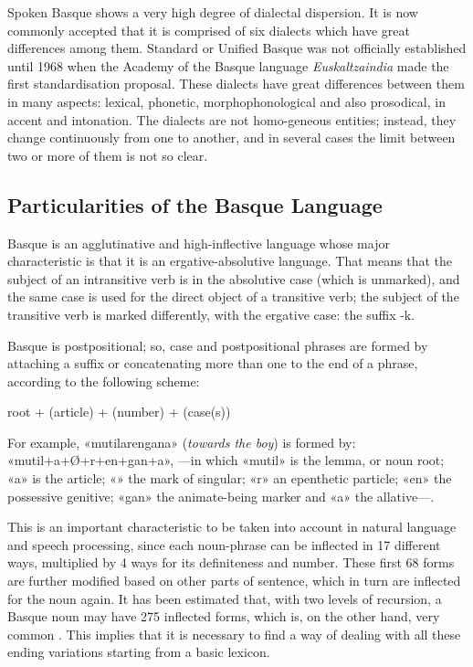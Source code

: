 \begin{multicols}{2}

Spoken Basque shows a very high degree of dialectal dispersion. It is now commonly accepted that it is comprised of six dialects which have great differences among them. Standard or Unified Basque was not officially established until 1968 when the Academy of the Basque language\textit{ Euskaltzaindia} \cite{BAS-Nota7}  made the first standardisation proposal. These dialects have great differences between them in many aspects: lexical, phonetic, morphophonological and also prosodical, in accent and intonation. The dialects are not homo-geneous entities; instead, they change continuously from one to another, and in several cases the limit between two or more of them is not so clear.

\subsection{Particularities of the Basque Language}
   Basque is an agglutinative and high-inflective language whose major characteristic is that it is an ergative-absolutive language. That means that the subject of an intransitive verb is in the absolutive case (which is unmarked), and the same case is used for the direct object of a transitive verb; the subject of the transitive verb is marked differently, with the ergative case: the suffix -k.


Basque is postpositional; so, case and postpositional phrases are formed by attaching a suffix or concatenating more than one to the end of a phrase, according to the following scheme:

\hspace{10pt}root + (article) + (number) + (case(s))

For example, «mutilarengana» (\textit{towards the boy}) is formed by: «mutil+a+Ø+r\-+en+gan+a», —in which «mutil» is the lemma, or noun root; «a» is the article; «» the mark of singular; «r» an epenthetic particle; «en» the possessive genitive; «gan» the animate-being marker and «a» the allative—.

This is an important characteristic to be taken into account in natural language and speech processing, since each noun-phrase can be inflected in 17 different ways, multiplied by 4 ways for its definiteness and number. These first 68 forms are further modified based on other parts of sentence, which in turn are inflected for the noun again. It has been estimated that, with two levels of recursion, a Basque noun may have 275 inflected forms, which is, on the other hand, very common \cite{BAS-Nota8}. This implies that it is necessary to find a way of dealing with all these ending variations starting from a basic lexicon. 


\end{multicols}

